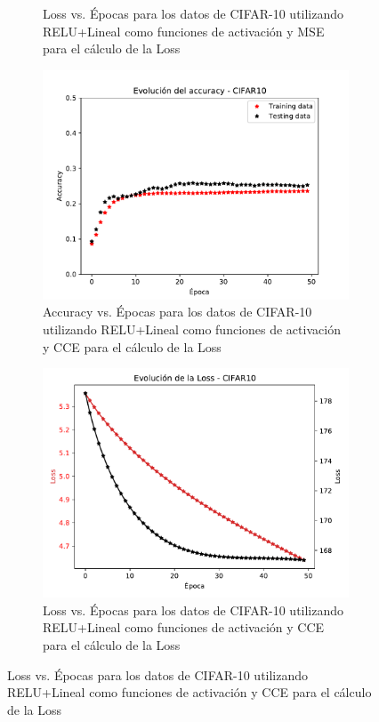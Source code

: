 \begin{figure}[H]
\begin{subfigure}[b]{0.45\textwidth}
         \caption{Loss vs. Épocas para los datos de CIFAR-10 utilizando RELU+Lineal como funciones de activación y MSE para el cálculo de la Loss}
         \label{fig:loss6a}
     \end{subfigure}
    \begin{subfigure}[b]{0.45\textwidth}
         \centering
         \includegraphics[width=\textwidth]{image/Accuracy50bz128td10000 - RELULIN-SMAX.pdf}
         \caption{Accuracy vs. Épocas para los datos de CIFAR-10 utilizando RELU+Lineal como funciones de activación y CCE para el cálculo de la Loss}
         \label{fig:acc6a}
     \end{subfigure}
     \hfill
     \begin{subfigure}[b]{0.45\textwidth}
         \centering
         \includegraphics[width=\textwidth]{image/Loss_ep50bz128td10000 - SMAX - RELULIN.pdf}
         \caption{Loss vs. Épocas para los datos de CIFAR-10 utilizando RELU+Lineal como funciones de activación y CCE para el cálculo de la Loss}
         \label{fig:loss6a}
     \end{subfigure}
\end{figure}

